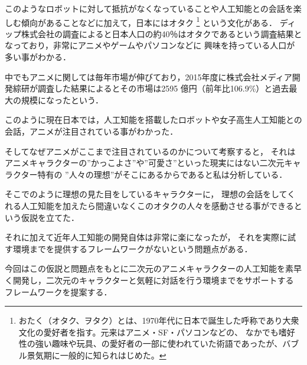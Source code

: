 このようなロボットに対して抵抗がなくなっていることや人工知能との会話を楽しむ傾向があることなどに加えて，日本にはオタク
\footnote{おたく（オタク、ヲタク）とは、1970年代に日本で誕生した呼称であり大衆文化の愛好者を指す。元来はアニメ・SF・パソコンなどの、
なかでも嗜好性の強い趣味や玩具、の愛好者の一部に使われていた術語であったが、バブル景気期に一般的に知られはじめた。\cite{ota}}
という文化がある．
ディップ株式会社の調査\cite{dip}によると日本人口の約40％はオタクであるという調査結果となっており，非常にアニメやゲームやパソコンなどに
興味を持っている人口が多い事がわかる．

中でもアニメに関しては毎年市場が伸びており，2015年度に株式会社メディア開発綜研が調査した結果によるとその市場は2595
億円（前年比106.9\%）と過去最大の規模になったという．\cite{anime}

このように現在日本では，人工知能を搭載したロボットや女子高生人工知能との会話，アニメが注目されている事がわかった．

そしてなぜアニメがここまで注目されているのかについて考察すると，
それはアニメキャラクターの”かっこよさ”や”可愛さ”といった現実にはない二次元キャラクター特有の
”人々の理想”がそこにあるからであると私は分析している．


そこでのように理想の見た目をしているキャラクターに，
理想の会話をしてくれる人工知能を加えたら間違いなくこのオタクの人々を感動させる事ができるという仮説を立てた．

それに加えて近年人工知能の開発自体は非常に楽になったが，
それを実際に試す環境までを提供するフレームワークがないという問題点がある．

今回はこの仮説と問題点をもとに二次元のアニメキャラクターの人工知能を素早く開発し，二次元のキャラクターと気軽に対話を行う環境までをサポートする
フレームワークを提案する．

